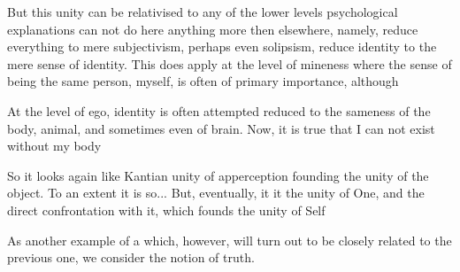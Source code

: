 {  But this unity can be relativised to any of the lower levels psychological
  explanations can not do here anything more then elsewhere, namely, reduce
  everything to mere subjectivism, perhaps even solipsism, reduce identity to
  the mere sense of identity. This does apply at the level of mineness where the
  sense of being the same person, myself, is often of primary importance,
  although
  
  At the level of ego, identity is often attempted reduced to the sameness of
  the body, animal, and sometimes even of brain. Now, it is true that I can not
  exist without my body
  
  So it looks again like Kantian unity of apperception founding the unity of the
  object. To an extent it is so... But, eventually, it it the unity of One, and
  the direct confrontation with it, which founds the unity of Self

} %


\label{sub:truth}
As another example of a  which, however, will turn out to be closely
related to the previous one, we consider the notion of truth. 


